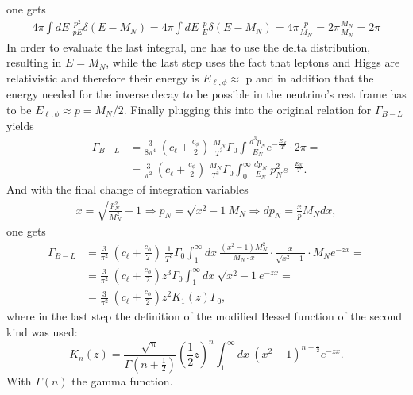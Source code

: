 one gets
\begin{align*}
	4\pi\int dE\: \frac{p^2}{pE}\delta\left(E-M_N\right)=4\pi\int dE\: \frac{p}{E}\delta\left(E-M_N\right)=4\pi\frac{p}{M_N}=2\pi \frac{M_N}{M_N}=2\pi
\end{align*}
In order to evaluate the last integral, one has to use the delta distribution, resulting in $E=M_{N}$, while the last step uses the fact that leptons and Higgs are relativistic and therefore their energy is $E_{\ell,\phi}\approx$ p and in addition that the energy needed for the inverse decay to be possible in the neutrino's rest frame has to be $E_{\ell,\phi}\approx p=M_{N}/2$. Finally plugging this into the original relation for $\Gamma_{B-L}$ yields
\begin{align*}
	\Gamma_{B-L}&=\frac{3}{8\pi^4}\:\left(c_\ell+\frac{c_\phi}{2}\right)\:\frac{M_N}{T^3}\Gamma_0\int \frac{d^3p_N}{E_N}e^{-\frac{E_N}{T}} \cdot 2\pi=\\
	&=\frac{3}{\pi^2}\:\left(c_\ell+\frac{c_\phi}{2}\right)\:\frac{M_N}{T^3}\Gamma_0\int_0^\infty \frac{dp_N}{E_N}\:p_N^2e^{-\frac{E_N}{T}}.
\end{align*}
And with the final change of integration variables 
\begin{align*}
	x=\sqrt{\frac{p_N^2}{M_N^2}+1}\Longrightarrow p_N=\sqrt{x^2-1}M_N \Longrightarrow dp_N=\frac{x}{p}M_Ndx,
\end{align*}
one gets 
\begin{align*}
	\Gamma_{B-L}&=\frac{3}{\pi^2}\:\left(c_\ell+\frac{c_\phi}{2}\right)\:\frac{1}{T^3}\Gamma_0\int_{1}^{\infty}dx\: \frac{\left(x^2-1 \right)M_N^2}{M_N\cdot x}\cdot \frac{x}{\sqrt{x^2-1}}\cdot M_N e^{-zx}=\\
	&=\frac{3}{\pi^2}\:\left(c_\ell+\frac{c_\phi}{2}\right)z^3\Gamma_0\int_{1}^{\infty}dx\: \sqrt{x^2-1}e^{-zx}=\\
	&=\frac{3}{\pi^2}\:\left(c_\ell+\frac{c_\phi}{2}\right)z^2K_1(z)\Gamma_0,
\end{align*}
where in the last step the definition of the modified Bessel function of the second kind was used:
\begin{equation*}
	K_n(z)=\frac{\sqrt{\pi}}{\Gamma\left(n+\frac{1}{2}\right)}\left(\frac{1}{2}z\right)^n\int_{1}^{\infty}dx\:\left(x^2-1\right)^{n-\frac{1}{2}}e^{-zx}.
\end{equation*}
With $\Gamma(n)$ the gamma function.

